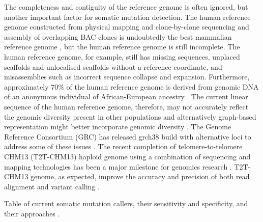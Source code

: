 The completeness and contiguity of the reference genome is often ignored, but another important factor for somatic mutation detection. The human reference genome constructed from physical mapping and clone-by-clone sequencing and assembly of overlapping BAC clones is undoubtedly the best mammalian reference genome \cite{Lander2001-du}, but the human reference genome is still incomplete. The human reference genome, for example, still has missing sequences, unplaced scaffolds and unlocalised scaffolds without a reference coordinate, and misassemblies such as incorrect sequence collapse and expansion. Furthermore, approximately 70\% of the human reference genome is derived from genomic DNA of an anonymous individual of African-European ancestry \cite{Osoegawa2001-np}. The current linear sequence of the human reference genome, therefore, may not accurately reflect the genomic diversity present in other populations and alternatively graph-based representation might better incorporate genomic diversity \cite{Garrison2018-ae}. The Genome Reference Consortium (GRC) has released grch38 build with alternative loci to address some of these issues \cite{Schneider2017-yo}. The recent completion of telomere-to-telomere CHM13 (T2T-CHM13) haploid genome using a combination of sequencing and mapping technologies has been a major milestone for genomics research \cite{Nurk2022-dv}. T2T-CHM13 genome, as expected, improve the accuracy and precision of both read alignment and variant calling \cite{Aganezov2022-dv}. 

Table of current somatic mutation callers, their sensitivity and specificity, and their approaches \cite{}.

